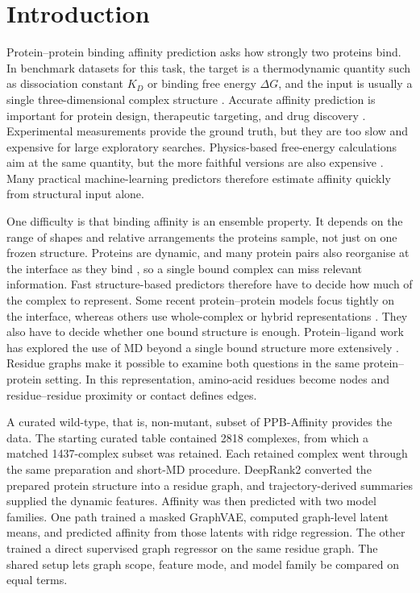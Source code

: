 \chapter{Introduction}
\label{ch:intro}

Protein--protein binding affinity prediction asks how strongly two proteins bind. In benchmark datasets for this task, the target is a thermodynamic quantity such as dissociation constant $K_D$ or binding free energy $\Delta G$, and the input is usually a single three-dimensional complex structure \citep{Liu2024PPBAffinity}. Accurate affinity prediction is important for protein design, therapeutic targeting, and drug discovery \citep{Guo2022PPBAReview,Modell2016PPIs}. Experimental measurements provide the ground truth, but they are too slow and expensive for large exploratory searches. Physics-based free-energy calculations aim at the same quantity, but the more faithful versions are also expensive \citep{Cournia2017RBFE,Siebenmorgen2020PPIReview}. Many practical machine-learning predictors therefore estimate affinity quickly from structural input alone.

One difficulty is that binding affinity is an ensemble property. It depends on the range of shapes and relative arrangements the proteins sample, not just on one frozen structure. Proteins are dynamic, and many protein pairs also reorganise at the interface as they bind \citep{HenzlerWildman2007Dynamic,Kastritis2011Benchmark}, so a single bound complex can miss relevant information. Fast structure-based predictors therefore have to decide how much of the complex to represent. Some recent protein--protein models focus tightly on the interface, whereas others use whole-complex or hybrid representations \citep{Liu2024PPBAffinity,Moal2011AffinityPrediction,RomeroMolina2022PPIAffinity,Xie2025PPIGraphomer}. They also have to decide whether one bound structure is enough. Protein--ligand work has explored the use of MD beyond a single bound structure more extensively \citep{Min2024Dynaformer,Libouban2025Spatiotemporal}. Residue graphs make it possible to examine both questions in the same protein--protein setting. In this representation, amino-acid residues become nodes and residue--residue proximity or contact defines edges.

A curated wild-type, that is, non-mutant, subset of PPB-Affinity \citep{Liu2024PPBAffinity} provides the data. The starting curated table contained 2818 complexes, from which a matched 1437-complex subset was retained. Each retained complex went through the same preparation and short-MD procedure. DeepRank2 converted the prepared protein structure into a residue graph, and trajectory-derived summaries supplied the dynamic features. Affinity was then predicted with two model families. One path trained a masked GraphVAE, computed graph-level latent means, and predicted affinity from those latents with ridge regression. The other trained a direct supervised graph regressor on the same residue graph. The shared setup lets graph scope, feature mode, and model family be compared on equal terms.

